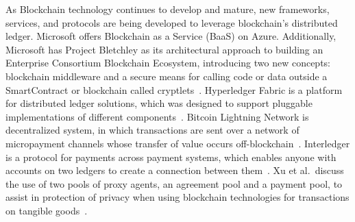 As Blockchain technology continues to develop and mature, new frameworks, services, and protocols are being developed to leverage blockchain's distributed ledger. Microsoft offers Blockchain as a Service (BaaS) on Azure. Additionally, Microsoft has Project Bletchley as its architectural approach to building an Enterprise Consortium Blockchain Ecosystem, introducing two new concepts: blockchain middleware and a secure means for calling code or data outside a SmartContract or blockchain called cryptlets~\cite{gray2016introducing}. Hyperledger Fabric is a platform for distributed ledger solutions, which was designed to support pluggable implementations of different components~\cite{hyperledger2017fabric}. Bitcoin Lightning Network is decentralized system, in which transactions are sent over a network of micropayment channels whose transfer of value occurs off-blockchain~\cite{poon2016bitcoin}. Interledger is a protocol for payments across payment systems, which enables anyone with accounts on two ledgers to create
a connection between them~\cite{thomas_protocol}. Xu et al.\ discuss the use of two pools of proxy agents, an agreement pool and a payment pool, to assist in protection of privacy when using blockchain technologies for transactions on tangible goods~\cite{Xu2017}.
\fi


